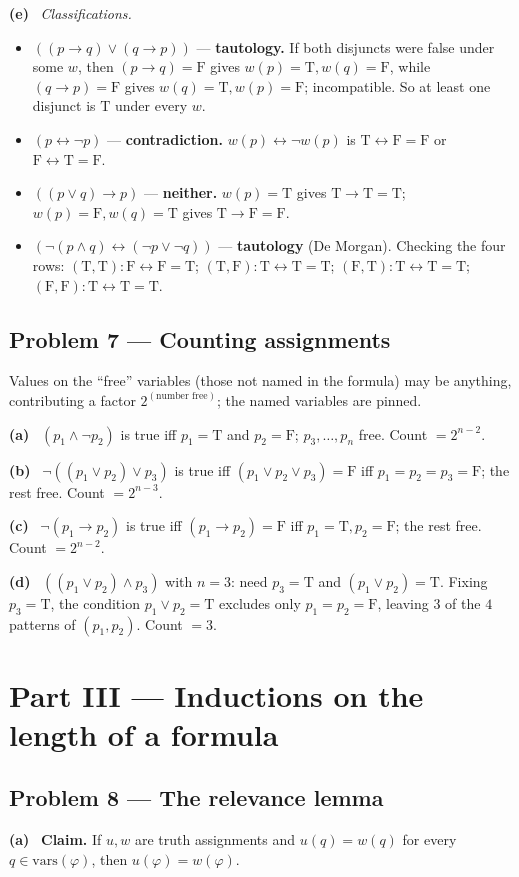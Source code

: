 \documentclass[11pt]{article}
\newcommand{\T}{\mathrm{T}}
\newcommand{\F}{\mathrm{F}}
\newcommand{\vars}{\mathrm{vars}}
\newcommand{\solpart}[1]{\smallskip\noindent\textbf{(#1)}\ }
\newcommand{\prob}[2]{\subsection*{Problem #1 --- #2}}
\begin{document}
\solpart{e} \emph{Classifications.}
\begin{itemize}[nosep]
\item $((p\to q)\lor(q\to p))$ --- \textbf{tautology.} If both disjuncts were
false under some $w$, then $(p\to q)=\F$ gives $w(p)=\T,w(q)=\F$, while $(q\to p)=
\F$ gives $w(q)=\T,w(p)=\F$; incompatible. So at least one disjunct is $\T$ under
every $w$.
\item $(p\leftrightarrow\lnot p)$ --- \textbf{contradiction.} $w(p)\leftrightarrow
\lnot w(p)$ is $\T\leftrightarrow\F=\F$ or $\F\leftrightarrow\T=\F$.
\item $((p\lor q)\to p)$ --- \textbf{neither.} $w(p)=\T$ gives $\T\to\T=\T$;
$w(p)=\F,w(q)=\T$ gives $\T\to\F=\F$.
\item $(\lnot(p\land q)\leftrightarrow(\lnot p\lor\lnot q))$ --- \textbf{tautology}
(De Morgan). Checking the four rows: $(\T,\T)\!:\F\!\leftrightarrow\!\F=\T$;
$(\T,\F)\!:\T\!\leftrightarrow\!\T=\T$; $(\F,\T)\!:\T\!\leftrightarrow\!\T=\T$;
$(\F,\F)\!:\T\!\leftrightarrow\!\T=\T$.
\end{itemize}

\prob{7}{Counting assignments}

Values on the ``free'' variables (those not named in the formula) may be anything,
contributing a factor $2^{(\text{number free})}$; the named variables are pinned.

\solpart{a} $(p_1\land\lnot p_2)$ is true iff $p_1=\T$ and $p_2=\F$; $p_3,\dots,
p_n$ free. Count $=2^{n-2}$.

\solpart{b} $\lnot((p_1\lor p_2)\lor p_3)$ is true iff $(p_1\lor p_2\lor p_3)=\F$
iff $p_1=p_2=p_3=\F$; the rest free. Count $=2^{n-3}$.

\solpart{c} $\lnot(p_1\to p_2)$ is true iff $(p_1\to p_2)=\F$ iff $p_1=\T,p_2=\F$;
the rest free. Count $=2^{n-2}$.

\solpart{d} $((p_1\lor p_2)\land p_3)$ with $n=3$: need $p_3=\T$ and $(p_1\lor p_2)
=\T$. Fixing $p_3=\T$, the condition $p_1\lor p_2=\T$ excludes only $p_1=p_2=\F$,
leaving $3$ of the $4$ patterns of $(p_1,p_2)$. Count $=3$.

\section*{Part III --- Inductions on the length of a formula}

\prob{8}{The relevance lemma}

\solpart{a} \textbf{Claim.} If $u,w$ are truth assignments and $u(q)=w(q)$ for
every $q\in\vars(\varphi)$, then $u(\varphi)=w(\varphi)$.
\end{document}

